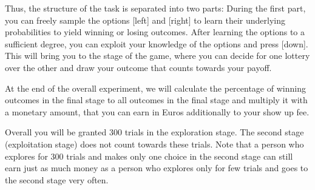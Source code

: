 \documentclass[12pt, oneside]{scrartcl}
\begin{document}
Thus, the structure of the task is separated into two parts: During the first part, you can freely sample the options [left] and [right] to learn their underlying probabilities to yield winning or losing outcomes. After learning the options to a sufficient degree, you can exploit your knowledge of the options and press [down]. This will bring you to the stage of the game, where you can decide for one lottery over the other and draw your outcome that counts towards your payoff. \vspace{\baselineskip}

At the end of the overall experiment, we will calculate the percentage of winning outcomes in the final stage to all outcomes in the final stage and multiply it with a monetary amount, that you can earn in Euros additionally to your show up fee.\vspace{\baselineskip}

Overall you will be granted 300 trials in the exploration stage. The second stage (exploitation stage) does not count towards these trials. Note that a person who explores for 300 trials and makes only one choice in the second stage can still earn just as much money as a person who explores only for few trials and goes to the second stage very often.

\pagebreak
\end{document}
